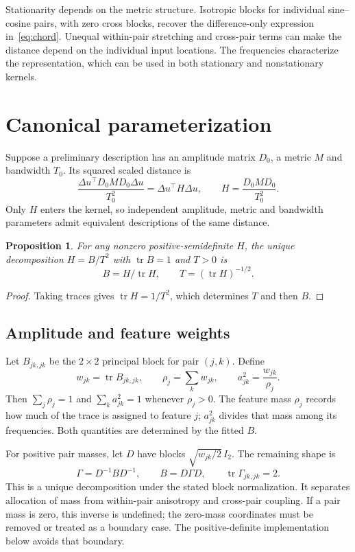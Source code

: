\documentclass[11pt]{article}
\newcommand{\tr}{\operatorname{tr}}
\newtheorem{proposition}{Proposition}
\begin{document}
Stationarity depends on the metric structure. Isotropic blocks for individual sine--cosine pairs, with zero cross blocks, recover the difference-only expression in~\eqref{eq:chord}. Unequal within-pair stretching and cross-pair terms can make the distance depend on the individual input locations. The frequencies characterize the representation, which can be used in both stationary and nonstationary kernels.

\section{Canonical parameterization}
Suppose a preliminary description has an amplitude matrix $D_0$, a metric $M$ and bandwidth $T_0$. Its squared scaled distance is
\begin{equation}
 \frac{\Delta u^\top D_0MD_0\Delta u}{T_0^2}
 =\Delta u^\top H\Delta u,
 \qquad H=\frac{D_0MD_0}{T_0^2}.
\end{equation}
Only $H$ enters the kernel, so independent amplitude, metric and bandwidth parameters admit equivalent descriptions of the same distance.

\begin{proposition}
For any nonzero positive-semidefinite $H$, the unique decomposition $H=B/T^2$ with $\tr B=1$ and $T>0$ is
\begin{equation}
 B=H/\tr H,\qquad T=(\tr H)^{-1/2}.
\end{equation}
\end{proposition}
\begin{proof}
Taking traces gives $\tr H=1/T^2$, which determines $T$ and then $B$.
\end{proof}

\subsection{Amplitude and feature weights}
Let $B_{jk,jk}$ be the $2\times2$ principal block for pair $(j,k)$. Define
\begin{equation}
 w_{jk}=\tr B_{jk,jk},\qquad
 \rho_j=\sum_k w_{jk},\qquad
 a_{jk}^2=\frac{w_{jk}}{\rho_j}.
 \label{eq:masses}
\end{equation}
Then $\sum_j\rho_j=1$ and $\sum_k a_{jk}^2=1$ whenever $\rho_j>0$. The feature mass $\rho_j$ records how much of the trace is assigned to feature $j$; $a_{jk}^2$ divides that mass among its frequencies. Both quantities are determined by the fitted $B$.

For positive pair masses, let $D$ have blocks $\sqrt{w_{jk}/2}\,I_2$. The remaining shape is
\begin{equation}
 \Gamma=D^{-1}BD^{-1},\qquad B=D\Gamma D,\qquad \tr \Gamma_{jk,jk}=2.
 \label{eq:shape}
\end{equation}
This is a unique decomposition under the stated block normalization. It separates allocation of mass from within-pair anisotropy and cross-pair coupling. If a pair mass is zero, this inverse is undefined; the zero-mass coordinates must be removed or treated as a boundary case. The positive-definite implementation below avoids that boundary.
\end{document}
